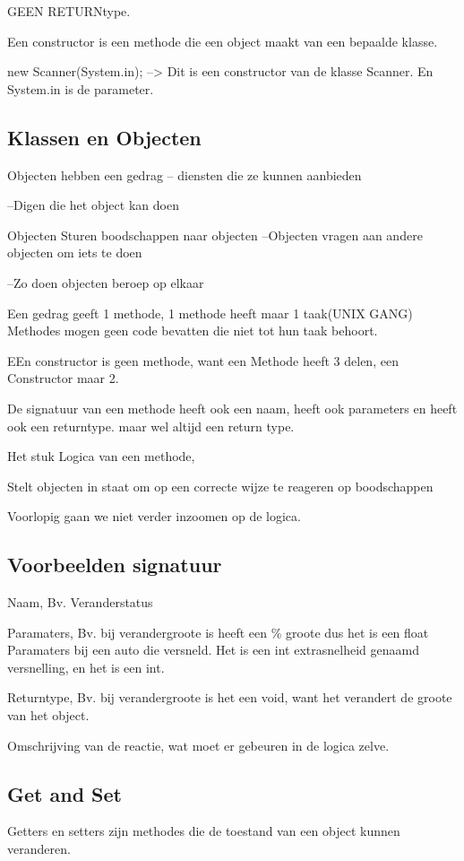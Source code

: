 \documentclass{article}
\begin{document}
GEEN RETURNtype.

Een constructor is een methode die een object maakt van een bepaalde klasse.


new Scanner(System.in); --> Dit is een constructor van de klasse Scanner. En System.in is de parameter.

\subsection{Klassen en Objecten}
Objecten hebben een gedrag
	-- diensten die ze kunnen aanbieden

	--Digen die het object kan doen

Objecten Sturen boodschappen naar objecten
	--Objecten vragen aan andere objecten om iets te doen

	--Zo doen objecten beroep op elkaar

Een gedrag geeft 1 methode, 1 methode heeft maar 1 taak(UNIX GANG)
Methodes mogen geen code bevatten die niet tot hun taak behoort.

EEn constructor is geen methode, want een Methode heeft 3 delen, een Constructor maar 2.

De signatuur van een methode heeft ook een naam, heeft ook parameters en heeft ook een returntype.
maar wel altijd een return type.

Het stuk Logica van een methode,

Stelt objecten in staat om op een correcte wijze te reageren op boodschappen

Voorlopig gaan we niet verder inzoomen op de logica.

\subsection{Voorbeelden signatuur}
Naam, Bv. Veranderstatus

Paramaters, Bv. bij verandergroote is heeft een \% groote dus het is een float
Paramaters bij een auto die versneld. Het is een int extrasnelheid genaamd versnelling, en het is een int.

Returntype, Bv. bij verandergroote is het een void, want het verandert de groote van het object.

Omschrijving van de reactie, wat moet er gebeuren in de logica zelve.

\subsection{Get and Set}
Getters en setters zijn methodes die de toestand van een object kunnen veranderen.
\end{document}
